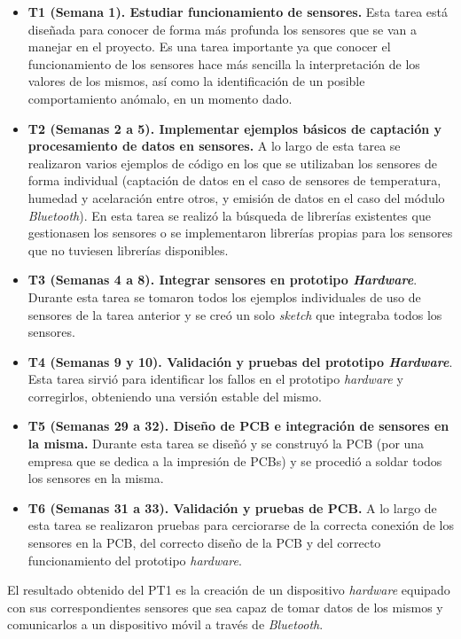 \begin{itemize}
\item \textbf{\ac{T}1 (Semana 1). Estudiar funcionamiento de sensores.} Esta tarea está diseñada para conocer de forma más profunda los sensores que se van a manejar en el proyecto. Es una tarea importante ya que conocer el funcionamiento de los sensores hace más sencilla la interpretación de los valores de los mismos, así como la identificación de un posible comportamiento anómalo, en un momento dado. 
\item \textbf{\ac{T}2 (Semanas 2 a 5). Implementar ejemplos básicos de captación y procesamiento de datos en sensores.} A lo largo de esta tarea se realizaron varios ejemplos de código en los que se utilizaban los sensores de forma individual (captación de datos en el caso de sensores de temperatura, humedad y acelaración entre otros, y emisión de datos en el caso del módulo \textit{Bluetooth}). En esta tarea se realizó la búsqueda de librerías existentes que gestionasen los sensores o se implementaron librerías propias para los sensores que no tuviesen librerías disponibles.
\item \textbf{\ac{T}3 (Semanas 4 a 8). Integrar sensores en prototipo \textit{Hardware}}. Durante esta tarea se tomaron todos los ejemplos individuales de uso de sensores de la tarea anterior y se creó un solo \textit{sketch} que integraba todos los sensores.
\item \textbf{\ac{T}4 (Semanas 9 y 10). Validación y pruebas del prototipo \textit{Hardware}}. Esta tarea sirvió para identificar los fallos en el prototipo \textit{hardware} y corregirlos, obteniendo una versión estable del mismo.
\item \textbf{\ac{T}5 (Semanas 29 a 32). Diseño de \ac{PCB} e integración de sensores en la misma.} Durante esta tarea se diseñó y se construyó la \ac{PCB} (por una empresa que se dedica a la impresión de \ac{PCB}s) y se procedió a soldar todos los sensores en la misma. 
\item \textbf{\ac{T}6 (Semanas 31 a 33). Validación y pruebas de \ac{PCB}.} A lo largo de esta tarea se realizaron pruebas para cerciorarse de la correcta conexión de los sensores en la \ac{PCB}, del correcto diseño de la \ac{PCB} y del correcto funcionamiento del prototipo \textit{hardware}.
\end{itemize}

El resultado obtenido del \ac{PT}1 es la creación de un dispositivo \textit{hardware} equipado con sus correspondientes sensores que sea capaz de tomar datos de los mismos y comunicarlos a un dispositivo móvil a través de \textit{Bluetooth}.

